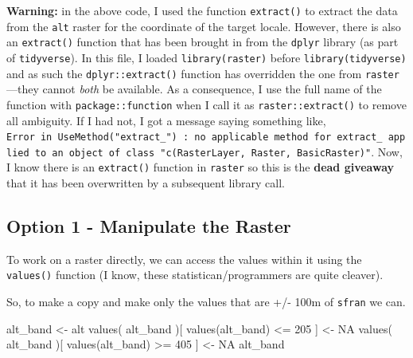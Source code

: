 \documentclass[
  letterpaper,
]{book}
\newenvironment{Shaded}{\begin{snugshade}}{\end{snugshade}}
\newcommand{\ConstantTok}[1]{\textcolor[rgb]{0.56,0.35,0.01}{#1}}
\newcommand{\DecValTok}[1]{\textcolor[rgb]{0.68,0.00,0.00}{#1}}
\newcommand{\FunctionTok}[1]{\textcolor[rgb]{0.28,0.35,0.67}{#1}}
\newcommand{\NormalTok}[1]{\textcolor[rgb]{0.00,0.23,0.31}{#1}}
\newcommand{\OtherTok}[1]{\textcolor[rgb]{0.00,0.23,0.31}{#1}}
\newcommand{\SpecialCharTok}[1]{\textcolor[rgb]{0.37,0.37,0.37}{#1}}
\begin{document}
\textbf{Warning:} in the above code, I used the function
\texttt{extract()} to extract the data from the \texttt{alt} raster for
the coordinate of the target locale. However, there is also an
\texttt{extract()} function that has been brought in from the
\texttt{dplyr} library (as part of \texttt{tidyverse}). In this file, I
loaded \texttt{library(raster)} before \texttt{library(tidyverse)} and
as such the \texttt{dplyr::extract()} function has overridden the one
from \texttt{raster}---they cannot \emph{both} be available. As a
consequence, I use the full name of the function with
\texttt{package::function} when I call it as \texttt{raster::extract()}
to remove all ambiguity. If I had not, I got a message saying something
like,
\texttt{Error\ in\ UseMethod("extract\_")\ :\ no\ applicable\ method\ for\ \textquotesingle{}extract\_\textquotesingle{}\ applied\ to\ an\ object\ of\ class\ "c(\textquotesingle{}RasterLayer\textquotesingle{},\ \textquotesingle{}Raster\textquotesingle{},\ \textquotesingle{}BasicRaster\textquotesingle{})"}.
Now, I know there is an \texttt{extract()} function in \texttt{raster}
so this is the \textbf{dead giveaway} that it has been overwritten by a
subsequent library call.

\subsection{Option 1 - Manipulate the
Raster}\label{option-1---manipulate-the-raster}

To work on a raster directly, we can access the values within it using
the \texttt{values()} function (I know, these statistican/programmers
are quite cleaver).

So, to make a copy and make only the values that are +/- 100m of
\texttt{sfran} we can.

\begin{Shaded}
\begin{Highlighting}[]
\NormalTok{alt\_band }\OtherTok{\textless{}{-}}\NormalTok{ alt}
\FunctionTok{values}\NormalTok{( alt\_band )[ }\FunctionTok{values}\NormalTok{(alt\_band) }\SpecialCharTok{\textless{}=} \DecValTok{205}\NormalTok{ ] }\OtherTok{\textless{}{-}} \ConstantTok{NA}
\FunctionTok{values}\NormalTok{( alt\_band )[ }\FunctionTok{values}\NormalTok{(alt\_band) }\SpecialCharTok{\textgreater{}=} \DecValTok{405}\NormalTok{ ] }\OtherTok{\textless{}{-}} \ConstantTok{NA}
\NormalTok{alt\_band}
\end{Highlighting}
\end{Shaded}
\end{document}
